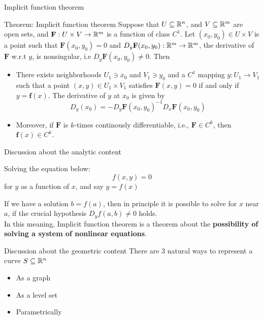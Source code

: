 \begin{frame}{Implicit function theorem}
    \begin{block}{Theorem: Implicit function theorem}
        Suppose that $U \subseteq \mathbb{R}^n$, and $V \subseteq \mathbb{R}^m$ are open sets, and $\mathbf{F}: U \times V \rightarrow \mathbb{R}^m$ is a function of class $C^1$. Let $(x_0, y_0) \in U \times V$ is a point such that $\mathbf{F}(x_0, y_0) = 0$ and $D_y\mathbf{F}(x_0, y_0) : \mathbb{R}^m \rightarrow \mathbb{R}^m$, the derivative of $\mathbf{F}$ w.r.t $y$, is nonsingular, i.e $D_y\mathbf{F}(x_0, y_0) \ne 0$. Then
        \begin{itemize}
            \item There exists neighborhoods $U_1 \ni x_0$ and $V_1 \ni y_0$ and a $C^1$ mapping $y: U_1 \rightarrow V_1$ such that a point $(x, y) \in U_1 \times V_1$ satisfies $\mathbf{F}(x, y) = 0$ if and only if $y = \mathbf{f}(x)$. The derivative of $y$ at $x_0$ is given by
            \begin{equation}
                D_y(x_0) = -D_y\mathbf{F}(x_0, y_0)^{-1}D_x\mathbf{F}(x_0, y_0)
            \end{equation}
            \item Moreover, if $\mathbf{F}$ is $k$-times continously differentiable, i.e., $\mathbf{F} \in C^k$, then $\mathbf{f}(x) \in C^k$.
        \end{itemize}
    \end{block}
\end{frame}

\begin{frame}{Discussion about the analytic content}
    \begin{parchment}[Problem]
        Solving the equation below:
        \begin{equation}
            f(x, y) = 0
        \end{equation}
        for $y$ as a function of $x$, and say $y = f(x)$
    \end{parchment}
    If we have a solution $b = f(a)$, then in principle it is possible to solve for $x$ near $a$, if the crucial hypothesis $D_yf(a, b) \ne 0$ holds.\\
    In this meaning, Implicit function theorem is a theorem about the \textbf{possibility of solving a system of nonlinear equations}.
\end{frame}

\begin{frame}{Discussion about the geometric content}
    There are 3 natural ways to represent a curve $S \subseteq \mathbb{R}^n$
    \begin{itemize}
        \item As a graph
        \item As a level set
        \item Parametrically
    \end{itemize}
\end{frame}

